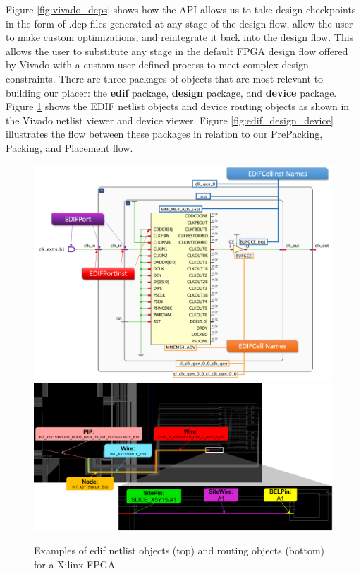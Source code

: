 \documentclass[twocolumn]{article}
\begin{document}
    Figure \ref{fig:vivado_dcps} shows how the API allows us to take design checkpoints in the form of .dcp files generated at any stage of the design flow, allow the user to make custom optimizations, and reintegrate it back into the design flow. 
    This allows the user to substitute any stage in the default FPGA design flow offered by Vivado with a custom user-defined process to meet complex design constraints. 
    There are three packages of objects that are most relevant to building our placer: the \textbf{edif} package, \textbf{design} package, and \textbf{device} package. 
    Figure \ref{fig:edif_objects} shows the EDIF netlist objects and device routing objects as shown in the Vivado netlist viewer and device viewer.
    Figure \ref{fig:edif_design_device} illustrates the flow between these packages in relation to our PrePacking, Packing, and Placement flow.

    \begin{figure}[t]
        \centering
        \includegraphics[width=14.0cm]{figures/edif_netlist.png}
        \includegraphics[width=14.0cm]{figures/routing_objects.png}
        \caption{Examples of edif netlist objects (top) and routing objects (bottom) for a Xilinx FPGA}
        \label{fig:edif_objects}
    \end{figure}
\end{document}
